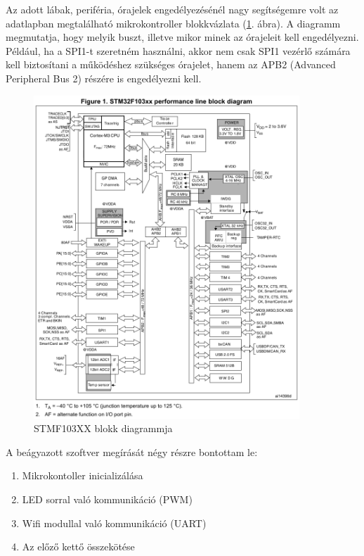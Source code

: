 \documentclass[../main.tex]{subfiles}
\begin{document}
        Az adott lábak, periféria, órajelek engedélyezésénél nagy segítségemre volt az adatlapban megtalálható mikrokontroller blokkvázlata (\ref{fig:stm32f103xx_block_diagram}. ábra). A diagramm megmutatja, hogy melyik buszt, illetve mikor minek az órajeleit kell engedélyezni. Például, ha a SPI1-t szeretném használni, akkor nem csak SPI1 vezérlő számára kell biztosítani a működéshez szükséges órajelet, hanem az APB2 (Advanced Peripheral Bus 2) részére is engedélyezni kell.
        \begin{figure}[h!]
            \centering
                \includegraphics[width=10cm]{resources/mbed_res/stm32f103xx_block_diagram.png}
                \caption{STMF103XX blokk diagrammja\cite{ds_stm32}}
                \label{fig:stm32f103xx_block_diagram}
        \end{figure}
        
        A beágyazott szoftver megírását négy részre bontottam le:
        \begin{enumerate}
            \item Mikrokontoller inicializálása
            \item LED sorral való kommunikáció (PWM)
            \item Wifi modullal való kommunikáció (UART)
            \item Az előző kettő összekötése
        \end{enumerate}
        
\end{document}
